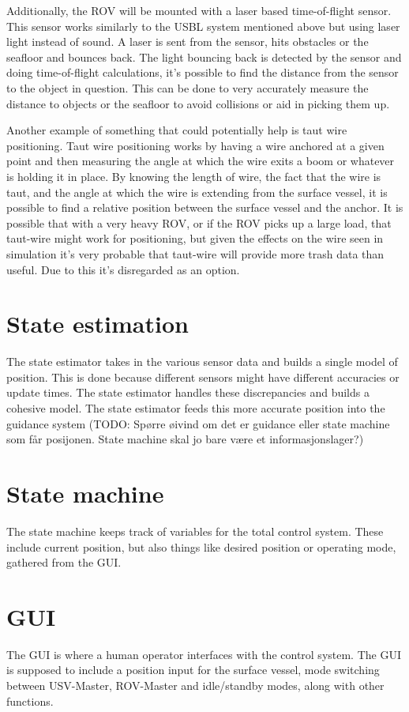 \documentclass[class=article, crop=false, draft=true]{standalone}
\begin{document}
Additionally, the ROV will be mounted with a laser based time-of-flight sensor. This sensor works similarly to the USBL system mentioned above but using laser light instead of sound. A laser is sent from the sensor, hits obstacles or the seafloor and bounces back. The light bouncing back is detected by the sensor and doing time-of-flight calculations, it's possible to find the distance from the sensor to the object in question. This can be done to very accurately measure the distance to objects or the seafloor to avoid collisions or aid in picking them up.

Another example of something that could potentially help is taut wire positioning. Taut wire positioning works by having a wire anchored at a given point and then measuring the angle at which the wire exits a boom or whatever is holding it in place. By knowing the length of wire, the fact that the wire is taut, and the angle at which the wire is extending from the surface vessel, it is possible to find a relative position between the surface vessel and the anchor. It is possible that with a very heavy ROV, or if the ROV picks up a large load, that taut-wire might work for positioning, but given the effects on the wire seen in simulation it's very probable that taut-wire will provide more trash data than useful. Due to this it's disregarded as an option.


\section{State estimation}
The state estimator takes in the various sensor data and builds a single model of position. This is done because different sensors might have different accuracies or update times. The state estimator handles these discrepancies and builds a cohesive model. The state estimator feeds this more accurate position into the guidance system (TODO: Spørre øivind om det er guidance eller state machine som får posijonen. State machine skal jo bare være et informasjonslager?)

\section{State machine}
The state machine keeps track of variables for the total control system. These include current position, but also things like desired position or operating mode, gathered from the GUI.

\section{GUI}
The GUI is where a human operator interfaces with the control system. The GUI is supposed to include a position input for the surface vessel, mode switching between USV-Master, ROV-Master and idle/standby modes, along with other functions.
\end{document}
